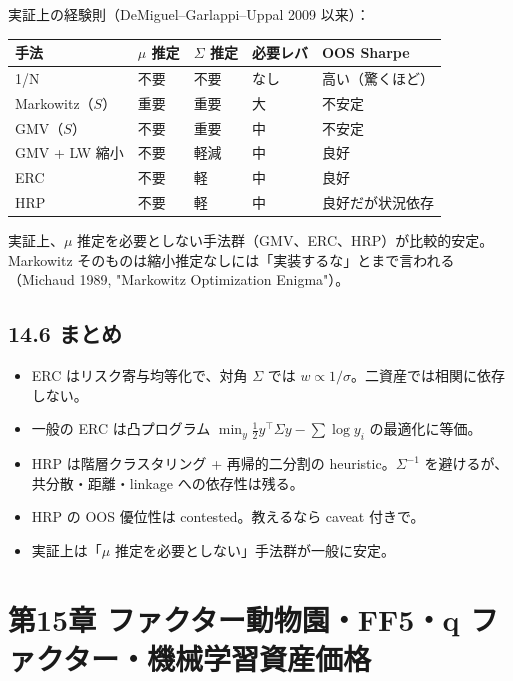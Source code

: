 \documentclass[11pt,a4paper]{report}
\begin{document}
実証上の経験則（DeMiguel–Garlappi–Uppal 2009 以来）：

\begin{center}
\begin{tabular}{|l|l|l|l|l|}
\hline
手法 & $\mu$ 推定 & $\Sigma$ 推定 & 必要レバ & OOS Sharpe \\ \hline
1/N & 不要 & 不要 & なし & 高い（驚くほど） \\ \hline
Markowitz（$S$） & 重要 & 重要 & 大 & 不安定 \\ \hline
GMV（$S$） & 不要 & 重要 & 中 & 不安定 \\ \hline
GMV + LW 縮小 & 不要 & 軽減 & 中 & 良好 \\ \hline
ERC & 不要 & 軽 & 中 & 良好 \\ \hline
HRP & 不要 & 軽 & 中 & 良好だが状況依存 \\ \hline
\end{tabular}
\end{center}

実証上、$\mu$ 推定を必要としない手法群（GMV、ERC、HRP）が比較的安定。Markowitz そのものは縮小推定なしには「実装するな」とまで言われる（Michaud 1989, "Markowitz Optimization Enigma"）。

\section{14.6 まとめ}

\begin{itemize}
\item ERC はリスク寄与均等化で、対角 $\Sigma$ では $w \propto 1/\sigma$。二資産では相関に依存しない。
\item 一般の ERC は凸プログラム $\min_y \tfrac{1}{2} y^\top \Sigma y - \sum \log y_i$ の最適化に等価。
\item HRP は階層クラスタリング + 再帰的二分割の heuristic。$\Sigma^{-1}$ を避けるが、共分散・距離・linkage への依存性は残る。
\item HRP の OOS 優位性は contested。教えるなら caveat 付きで。
\item 実証上は「$\mu$ 推定を必要としない」手法群が一般に安定。
\end{itemize}

\noindent\hrulefill

\chapter{第15章 ファクター動物園・FF5・q ファクター・機械学習資産価格}
\end{document}
